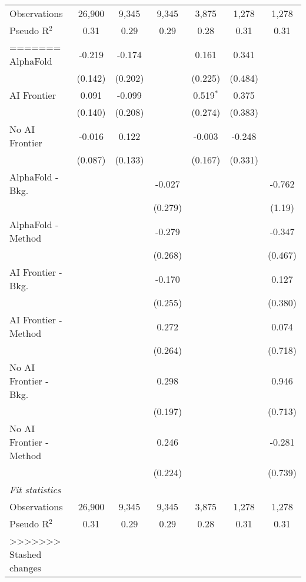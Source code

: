 \begin{tabular}{lcccccc}
   Observations            & 26,900  & 9,345   & 9,345   & 3,875       & 1,278  & 1,278\\  
   Pseudo R$^2$            & 0.31    & 0.29    & 0.29    & 0.28        & 0.31   & 0.31\\  
=======
   AlphaFold               & -0.219  & -0.174  &         & 0.161       & 0.341   &   \\   
                           & (0.142) & (0.202) &         & (0.225)     & (0.484) &   \\   
   AI Frontier             & 0.091   & -0.099  &         & 0.519$^{*}$ & 0.375   &   \\   
                           & (0.140) & (0.208) &         & (0.274)     & (0.383) &   \\   
   No AI Frontier          & -0.016  & 0.122   &         & -0.003      & -0.248  &   \\   
                           & (0.087) & (0.133) &         & (0.167)     & (0.331) &   \\   
   AlphaFold - Bkg.        &         &         & -0.027  &             &         & -0.762\\   
                           &         &         & (0.279) &             &         & (1.19)\\   
   AlphaFold - Method      &         &         & -0.279  &             &         & -0.347\\   
                           &         &         & (0.268) &             &         & (0.467)\\   
   AI Frontier - Bkg.      &         &         & -0.170  &             &         & 0.127\\   
                           &         &         & (0.255) &             &         & (0.380)\\   
   AI Frontier - Method    &         &         & 0.272   &             &         & 0.074\\   
                           &         &         & (0.264) &             &         & (0.718)\\   
   No AI Frontier - Bkg.   &         &         & 0.298   &             &         & 0.946\\   
                           &         &         & (0.197) &             &         & (0.713)\\   
   No AI Frontier - Method &         &         & 0.246   &             &         & -0.281\\   
                           &         &         & (0.224) &             &         & (0.739)\\   
   \midrule
   \emph{Fit statistics}\\
   Observations            & 26,900  & 9,345   & 9,345   & 3,875       & 1,278   & 1,278\\  
   Pseudo R$^2$            & 0.31    & 0.29    & 0.29    & 0.28        & 0.31    & 0.31\\  
>>>>>>> Stashed changes
   

\end{tabular}
